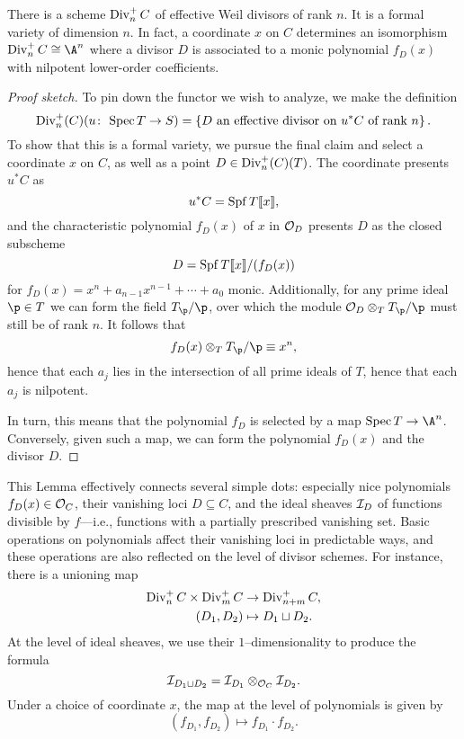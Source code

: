 \begin{lemma}
There is a scheme \(\operatorname{Div}_n^+ C\) of effective Weil divisors of rank \(n\).  It is a formal variety of dimension \(n\).  In fact, a coordinate \(x\) on \(C\) determines an isomorphism \(\Div_n^+ C \cong \A^n\) where a divisor \(D\) is associated to a monic polynomial \(f_D(x)\) with nilpotent lower-order coefficients.
\end{lemma}
\begin{proof}[Proof sketch]
To pin down the functor we wish to analyze, we make the definition \[\operatorname{Div}_n^+(C)(u\colon\thinspace \operatorname{Spec} T \to S) = \left\{\text{\(D\) an effective divisor on \(u^* C\) of rank \(n\)}\right\}.\]  To show that this is a formal variety, we pursue the final claim and select a coordinate \(x\) on \(C\), as well as a point \(D \in \operatorname{Div}_n^+(C)(T)\).  The coordinate presents \(u^* C\) as \[u^* C = \operatorname{Spf} T\llbracket x \rrbracket,\] and the characteristic polynomial \(f_D(x)\) of \(x\) in \(\mathcal{O}_D\) presents \(D\) as the closed subscheme \[D = \operatorname{Spf} T\llbracket x \rrbracket / (f_D(x))\] for \(f_D(x) = x^n + a_{n-1} x^{n-1} + \cdots + a_0\) monic.  Additionally, for any prime ideal \(\p \in T\) we can form the field \(T_{\p} / \p\), over which the module \(\sheaf O_D \otimes_T T_{\p} / \p\) must still be of rank \(n\).  It follows that \[f_D(x) \otimes_T T_{\p} / \p \equiv x^n,\] hence that each \(a_j\) lies in the intersection of all prime ideals of \(T\), hence that each \(a_j\) is nilpotent.

In turn, this means that the polynomial \(f_D\) is selected by a map \(\Spec T \to \A^n\).  Conversely, given such a map, we can form the polynomial \(f_D(x)\) and the divisor \(D\).
\end{proof}

\begin{remark}\label{DescriptionOfSqCupMapOnPolynomials}
This Lemma effectively connects several simple dots: especially nice polynomials \(f_D(x) \in \mathcal{O}_C\), their vanishing loci \(D \subseteq C\), and the ideal sheaves \(\mathcal{I}_D\) of functions divisible by \(f\)---i.e., functions with a partially prescribed vanishing set.  Basic operations on polynomials affect their vanishing loci in predictable ways, and these operations are also reflected on the level of divisor schemes.  For instance, there is a unioning map
\begin{align*}
\operatorname{Div}_n^+ C \times \operatorname{Div}_m^+ C & \to \operatorname{Div}_{n+m}^+ C, \\
(D_1, D_2) & \mapsto D_1 \sqcup D_2.
\end{align*}
At the level of ideal sheaves, we use their \(1\)--dimensionality to produce the formula \[\mathcal{I}_{D_1 \sqcup D_2} = \mathcal{I}_{D_1} \otimes_{\mathcal{O}_C} \mathcal{I}_{D_2}.\]  Under a choice of coordinate \(x\), the map at the level of polynomials is given by \[(f_{D_1}, f_{D_2}) \mapsto f_{D_1} \cdot f_{D_2}.\]
\end{remark}

